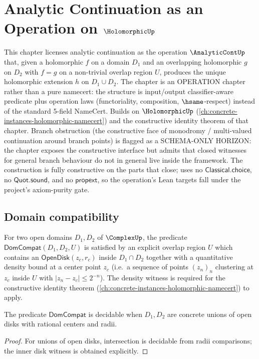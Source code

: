 \chapter{Analytic Continuation as an Operation on \(\HolomorphicUp\)}
\label{ch:concrete-instances-analytic-continuation}

This chapter licenses analytic continuation as the operation \(\AnalyticContUp\) that, given a holomorphic \(f\) on a domain \(D_1\) and an overlapping holomorphic \(g\) on \(D_2\) with \(f = g\) on a non-trivial overlap region \(U\), produces the unique holomorphic extension \(h\) on \(D_1 \cup D_2\). The chapter is an OPERATION chapter rather than a pure namecert: the structure is input/output classifier-aware predicate plus operation laws (functoriality, composition, \(\hsame\)-respect) instead of the standard 5-field NameCert. Builds on \(\HolomorphicUp\) (\autoref{ch:concrete-instances-holomorphic-namecert}) and the constructive identity theorem of that chapter. Branch obstruction (the constructive face of monodromy / multi-valued continuation around branch points) is flagged as a SCHEMA-ONLY HORIZON: the chapter exposes the constructive interface but admits that closed witnesses for general branch behaviour do not in general live inside the framework. The construction is fully constructive on the parts that close; uses no \(\mathsf{Classical.choice}\), no \(\mathsf{Quot.sound}\), and no \(\mathsf{propext}\), so the operation's Lean targets fall under the project's axiom-purity gate.

\section{Domain compatibility}

\begin{definition}
\label{def:dom-compat}
For two open domains \(D_1, D_2\) of \(\ComplexUp\), the predicate \(\mathsf{DomCompat}(D_1, D_2, U)\) is satisfied by an explicit overlap region \(U\) which contains an \(\mathsf{OpenDisk}(z_c, r_c)\) inside \(D_1 \cap D_2\) together with a quantitative density bound at a center point \(z_c\) (i.e.\ a sequence of points \((z_n)_n\) clustering at \(z_c\) inside \(U\) with \(|z_n - z_c| \leq 2^{-n}\)). The density witness is required for the constructive identity theorem (\autoref{ch:concrete-instances-holomorphic-namecert}) to apply.
\end{definition}

\begin{lemma}
\label{lem:dom-compat-witness}
The predicate \(\mathsf{DomCompat}\) is decidable when \(D_1, D_2\) are concrete unions of open disks with rational centers and radii.
\end{lemma}
\begin{proof}
For unions of open disks, intersection is decidable from radii comparisons; the inner disk witness is obtained explicitly.
\end{proof}

